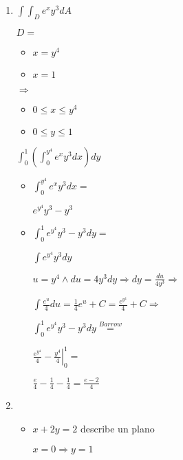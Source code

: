 \documentclass[../parcial.tex]{subfiles}
\begin{document}
    \begin{enumerate}
        \item $ \int \int_D e^xy^3 dA $
        
            $D=$ \begin{itemize}
                \item $ x= y^4$
                \item $ x= 1$
            \end{itemize} $\Rightarrow$

            \begin{itemize}
                \item $ 0 \leq x \leq y^4 $
                \item $ 0 \leq y \leq 1 $
            \end{itemize}

            $ \int_0^1 (\int_0^{y^4} e^xy^3 dx) dy $

            \begin{itemize}
                \item $\int_0^{y^4} e^xy^3 dx = $
                
                    $ e^{y^4}y^3 - y^3 $
                
                \item $\int_0^1 e^{y^4}y^3 - y^3 dy = $
                
                    \qquad $\int e^{y^4}y^3 dy $

                    \qquad $ u = y^4 \wedge du = 4y^3 dy \Rightarrow dy = \frac{du}{4y^3} \Rightarrow $

                    \qquad $ \int \frac{e^u}{4} du = \frac{1}{4}e^u + C = \frac{e^{y^4}}{4} + C \Rightarrow$

                    $\int_0^1 e^{y^4}y^3 - y^3 dy \stackrel{Barrow}{=} $

                    $ \left. \frac{e^{y^4}}{4} - \frac{y^4}{4} \right |_0^1 = $

                    $ \frac{e}{4} - \frac{1}{4} - \frac{1}{4} = \frac{e-2}{4}$

            \end{itemize}

        \item
            \begin{itemize}
                \item $ x + 2y = 2$ describe un plano
                
                    $ x = 0 \Rightarrow y = 1$


\end{itemize}
\end{enumerate}
\end{document}
